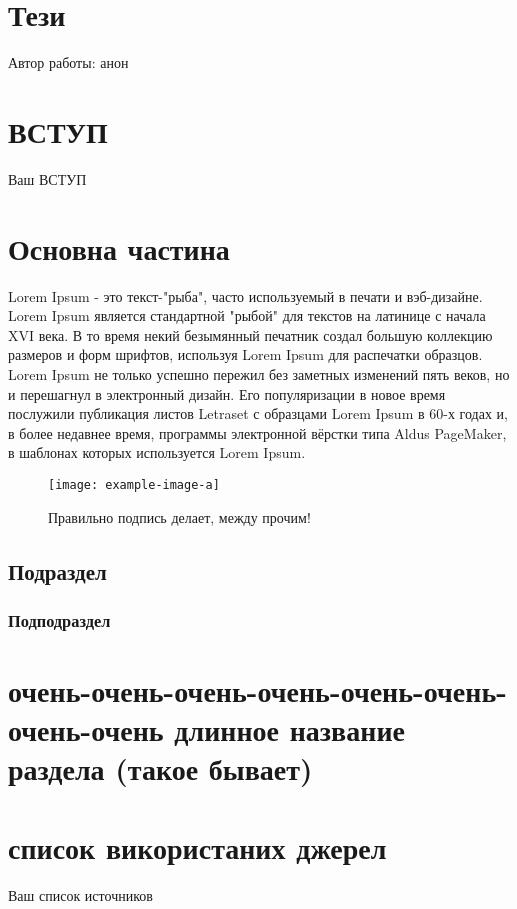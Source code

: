 \documentclass[a4paper, 14pt]{article}
\let\stdsection\section
\renewcommand\section{\newpage\stdsection}
\begin{document}
\section*{Т\lowercase{ези}}
Автор работы: анон
\newpage

\renewcommand{\contentsname}{\normalsize \hspace{1.25em} ЗМІСТ} %

\tableofcontents %

\newpage
{} %
\section*{\textbf{ВСТУП}}
Ваш ВСТУП
\newpage %
\section{Основна частина}
Lorem Ipsum - это текст-"рыба", часто используемый в печати и вэб-дизайне. Lorem Ipsum является стандартной "рыбой" для текстов на латинице с начала XVI века. В то время некий безымянный печатник создал большую коллекцию размеров и форм шрифтов, используя Lorem Ipsum для распечатки образцов. Lorem Ipsum не только успешно пережил без заметных изменений пять веков, но и перешагнул в электронный дизайн. Его популяризации в новое время послужили публикация листов Letraset с образцами Lorem Ipsum в 60-х годах и, в более недавнее время, программы электронной вёрстки типа Aldus PageMaker, в шаблонах которых используется Lorem Ipsum.
\begin{figure}[h]
    \centering
    \texttt{[image: example-image-a]}
    \caption{Правильно подпись делает, между прочим!}
    \label{fig:mesh1}
\end{figure}
 
\subsection{Подраздел}
\subsubsection{Подподраздел}
\section{очень-очень-очень-очень-очень-очень-очень-очень длинное название раздела (такое бывает)}
\section*{список використаних джерел}
Ваш список источников
\end{document}
